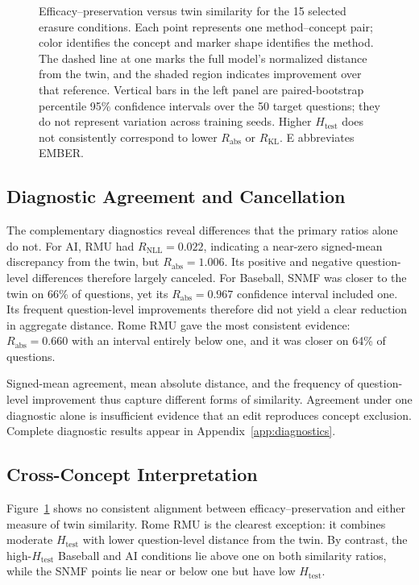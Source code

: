 \begin{figure}[t]
  \caption{Efficacy--preservation versus twin similarity for the 15 selected
  erasure conditions. Each point represents one method--concept pair; color
  identifies the concept and marker shape identifies the method. The dashed
  line at one marks the full model's normalized distance from the twin, and
  the shaded region indicates improvement over that reference. Vertical bars
  in the left panel are paired-bootstrap percentile 95\% confidence intervals
  over the 50 target questions; they do not represent variation across training
  seeds. Higher $H_{\mathrm{test}}$ does not consistently correspond to lower
  $R_{\mathrm{abs}}$ or $R_{\mathrm{KL}}$. E abbreviates EMBER.}
  \label{fig:efficacy-similarity}
\end{figure}

\subsection{Diagnostic Agreement and Cancellation}

The complementary diagnostics reveal differences that the primary ratios
alone do not. For AI, RMU had $R_{\mathrm{NLL}}=0.022$, indicating a near-zero
signed-mean discrepancy from the twin, but
$R_{\mathrm{abs}}=1.006$. Its positive and negative question-level
differences therefore largely canceled. For Baseball, SNMF was closer to the
twin on 66\% of questions, yet its $R_{\mathrm{abs}}=0.967$ confidence interval
included one. Its frequent question-level improvements therefore did not yield
a clear reduction in aggregate distance. Rome RMU gave the most consistent
evidence:
$R_{\mathrm{abs}}=0.660$ with an interval entirely below one, and it was closer
on 64\% of questions.

Signed-mean agreement, mean absolute distance, and the frequency of
question-level improvement thus capture different forms of similarity.
Agreement under one diagnostic alone is insufficient evidence that an edit
reproduces concept exclusion. Complete diagnostic results appear in
Appendix~\ref{app:diagnostics}.

\subsection{Cross-Concept Interpretation}

Figure~\ref{fig:efficacy-similarity} shows no consistent alignment between
efficacy--preservation and either measure of twin similarity. Rome RMU is the
clearest exception: it combines moderate $H_{\mathrm{test}}$ with lower
question-level distance from the twin. By contrast, the high-$H_{\mathrm{test}}$
Baseball and AI conditions lie above one on both similarity ratios, while the
SNMF points lie near or below one but have low $H_{\mathrm{test}}$.

